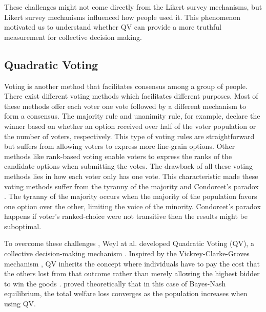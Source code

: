 These challenges might not come directly from the Likert survey mechanisms, but Likert survey mechanisms influenced how people used it. This phenomenon motivated us to understand whether QV can provide a more truthful measurement for collective decision making.\par

\subsection{Quadratic Voting}
Voting is another method that facilitates consensus among a group of people. There exist different voting methods which facilitates different purposes. Most of these methods offer each voter one vote followed by a different mechanism to form a consensus. The majority rule and unanimity rule, for example, declare the winner based on whether an option received over half of the voter population or the number of voters, respectively. This type of voting rules are straightforward but suffers from allowing voters to express more fine-grain options\cite{sep-voting-methods}. Other methods like rank-based voting enable voters to express the ranks of the candidate options when submitting the votes. The drawback of all these voting methods lies in how each voter only has one vote. This characteristic made these voting methods suffer from the tyranny of the majority and Condorcet's paradox \cite{sep-voting-methods}. The tyranny of the majority occurs when the majority of the population favors one option over the other, limiting the voice of the minority. Condorcet's paradox happens if voter's ranked-choice were not transitive then the results might be suboptimal.

To overcome these challenges \cite{posner2018radical}, Weyl at al. developed Quadratic Voting (QV), a collective decision-making mechanism \cite{lalley2018quadratic}. Inspired by the Vickrey-Clarke-Groves mechanism \cite{roughgarden2010algorithmic}, QV inherits the concept where individuals have to pay the cost that the others lost from that outcome rather than merely allowing the highest bidder to win the goods \cite{posner2018radical}. \textcite{lalley2018quadratic} proved theoretically that in this case of Bayes-Nash equilibrium, the total welfare loss converges as the population increases when using QV.\par


